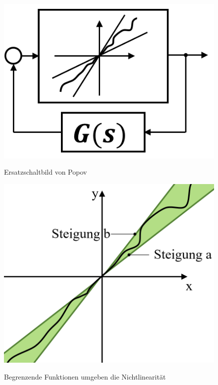 \begin{figure}[!h]
	\footnotesize
	\begin{minipage}{0.25\linewidth}
		\footnotesize
		\includegraphics[width=1\linewidth]{./bilder/Popov2.png}
		\caption{Ersatzschaltbild von Popov}
	\end{minipage}\hspace{0.1\linewidth}
	\begin{minipage}{0.25\linewidth}
		\footnotesize
		\includegraphics[width=1\linewidth]{./bilder/Popov1.png}
		\label{fig:Popov1}
		\caption{Begrenzende Funktionen umgeben die Nichtlinearität}
	\end{minipage}\hspace{0.1\linewidth}

\end{figure}
